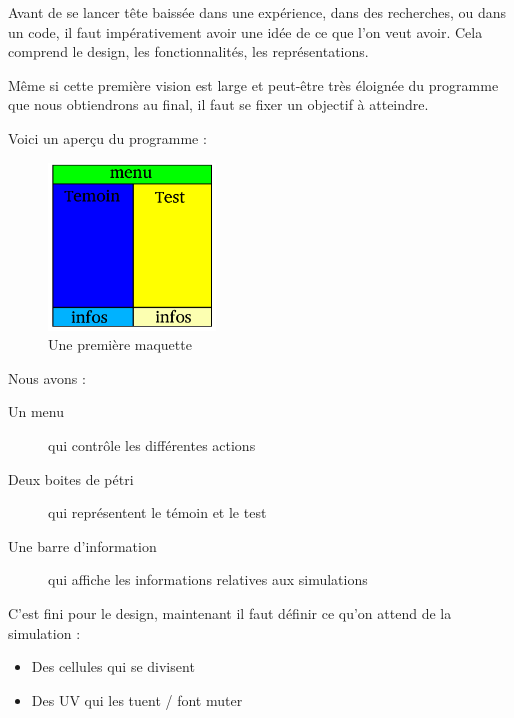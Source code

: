 Avant de se lancer tête baissée dans une expérience, dans des recherches, ou dans un code, il faut impérativement avoir une idée de ce que l'on veut avoir.
Cela comprend le design, les fonctionnalités, les représentations.

Même si cette première vision est large et peut-être très éloignée du programme que nous obtiendrons au final, il faut se fixer un objectif à atteindre.

Voici un aperçu du programme : 
\begin{figure}[H]
	\begin{center}
	  \includegraphics[width=12em]{Images/maquette.pdf}
	\end{center}
	\caption{Une première maquette}
	\label{Maquette}
\end{figure}

Nous avons : 
\begin{description}
	\item[Un menu] qui contrôle les différentes actions
	\item[Deux boites de pétri] qui représentent le témoin et le test
	\item[Une barre d'information] qui affiche les informations relatives aux simulations
\end{description}

C'est fini pour le design, maintenant il faut définir ce qu'on attend de la simulation : 
\begin{itemize}
	\item Des cellules qui se divisent
	\item Des UV qui les tuent / font muter
\end{itemize}




